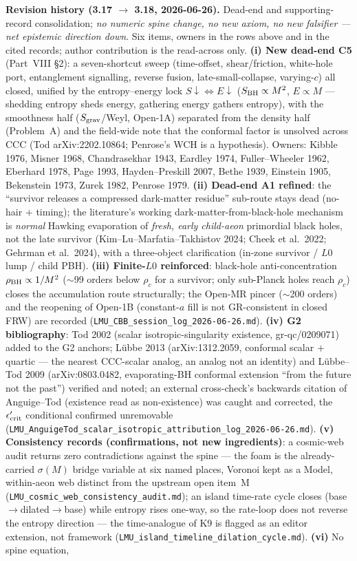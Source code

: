 \documentclass[11pt]{article}
\begin{document}
{\smallskip\noindent\textbf{Revision history (3.17 $\to$ 3.18, 2026-06-26).} Dead-end and supporting-record consolidation; \emph{no numeric spine change, no new axiom, no new falsifier --- net epistemic direction down}. Six items, owners in the rows above and in the cited records; author contribution is the read-across only. \textbf{(i) New dead-end C5} (Part~VIII \S2): a seven-shortcut sweep (time-offset, shear/friction, white-hole port, entanglement signalling, reverse fusion, late-small-collapse, varying-$c$) all closed, unified by the entropy--energy lock $S\!\downarrow\Leftrightarrow E\!\downarrow$ ($S_{\rm BH}\propto M^2$, $E\propto M$ --- shedding entropy sheds energy, gathering energy gathers entropy), with the smoothness half ($S_{\rm grav}$/Weyl, Open-1A) separated from the density half (Problem~A) and the field-wide note that the conformal factor is unsolved across CCC (Tod arXiv:2202.10864; Penrose's WCH is a hypothesis). Owners: Kibble 1976, Misner 1968, Chandrasekhar 1943, Eardley 1974, Fuller--Wheeler 1962, Eberhard 1978, Page 1993, Hayden--Preskill 2007, Bethe 1939, Einstein 1905, Bekenstein 1973, Zurek 1982, Penrose 1979. \textbf{(ii) Dead-end A1 refined}: the ``survivor releases a compressed dark-matter residue'' sub-route stays dead (no-hair $+$ timing); the literature's working dark-matter-from-black-hole mechanism is \emph{normal} Hawking evaporation of \emph{fresh, early child-aeon} primordial black holes, not the late survivor (Kim--Lu--Marfatia--Takhistov 2024; Cheek et al.\ 2022; Gehrman et al.\ 2024), with a three-object clarification (in-zone survivor / $L0$ lump / child PBH). \textbf{(iii) Finite-$L0$ reinforced}: black-hole anti-concentration $\rho_{\rm BH}\propto1/M^2$ ($\sim$99 orders below $\rho_c$ for a survivor; only sub-Planck holes reach $\rho_c$) closes the accumulation route structurally; the Open-MR pincer ($\sim$200 orders) and the reopening of Open-1B (constant-$a$ fill is not GR-consistent in closed FRW) are recorded (\texttt{LMU\_CBB\_session\_log\_2026-06-26.md}). \textbf{(iv) G2 bibliography}: Tod 2002 (scalar isotropic-singularity existence, gr-qc/0209071) added to the G2 anchors; Lübbe 2013 (arXiv:1312.2059, conformal scalar $+$ quartic --- the nearest CCC-scalar analog, an analog not an identity) and Lübbe--Tod 2009 (arXiv:0803.0482, evaporating-BH conformal extension ``from the future not the past'') verified and noted; an external cross-check's backwards citation of Anguige--Tod (existence read as non-existence) was caught and corrected, the $\epsilon'_{\rm crit}$ conditional confirmed unremovable (\texttt{LMU\_AnguigeTod\_scalar\_isotropic\_attribution\_log\_2026-06-26.md}). \textbf{(v) Consistency records (confirmations, not new ingredients)}: a cosmic-web audit returns zero contradictions against the spine --- the foam is the already-carried $\sigma(M)$ bridge variable at six named places, Voronoi kept as a Model, within-aeon web distinct from the upstream open item~M (\texttt{LMU\_cosmic\_web\_consistency\_audit.md}); an island time-rate cycle closes (base$\to$dilated$\to$base) while entropy rises one-way, so the rate-loop does not reverse the entropy direction --- the time-analogue of K9 is flagged as an editor extension, not framework (\texttt{LMU\_island\_timeline\_dilation\_cycle.md}). \textbf{(vi)} No spine equation, }
\end{document}
